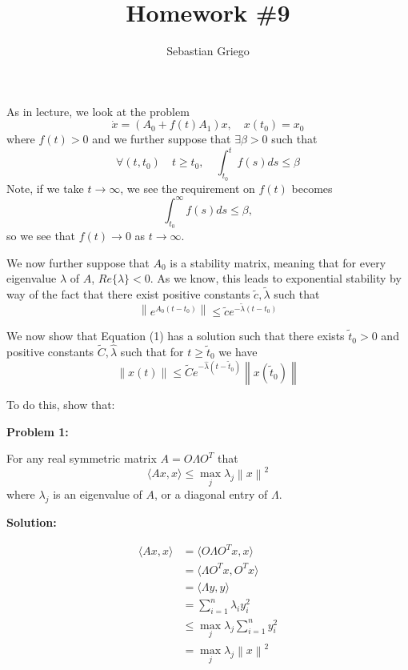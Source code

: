 \documentclass[12pt]{article}
\newcommand{\norm}[1]{\left\lVert #1 \right\rVert}
\newenvironment{problem}[1]{
    \textbf{Problem #1:}
}{
    \rmfamily \vspace{1em}
}
\newenvironment{solution}{
    \textbf{Solution:}
    
}{
    
    \vspace{2em}
}
\begin{document}
\title{Homework \#9}  %
\author{Sebastian Griego}  %
\maketitle

    As in lecture, we look at the problem
    \[
        \dot{x} = (A_0 + f(t)A_1)x, \quad x(t_0) = x_0 \tag{1}
    \]
    where \(f(t) > 0\) and we further suppose that \(\exists \beta > 0\) such that
    \[
        \forall(t, t_0) \quad t \geq t_0, \quad \int_{t_0}^t f(s)ds \leq \beta \tag{2}
    \]
    Note, if we take \(t \to \infty\), we see the requirement on \(f(t)\) becomes
    \[
        \int_{t_0}^{\infty} f(s)ds \leq \beta,
    \]
    so we see that \(f(t) \to 0\) as \(t \to \infty\).

    We now further suppose that \(A_0\) is a stability matrix, meaning that for every eigenvalue \(\lambda\) of \(A\), \(Re\{\lambda\} < 0\). As we know, this leads to exponential stability by way of the fact that there exist positive constants \(\tilde{c}, \tilde{\lambda}\) such that
    \[
        \norm{e^{A_0(t-t_0)}} \leq \tilde{c}e^{-\tilde{\lambda}(t-t_0)}
    \]

    We now show that Equation (1) has a solution such that there exists \(\tilde{t}_0 > 0\) and positive constants \(\tilde{C}, \hat{\lambda}\) such that for \(t \geq \tilde{t}_0\) we have
    \[
        \norm{x(t)} \leq \tilde{C}e^{-\hat{\lambda}(t-\tilde{t}_0)}\norm{x(\tilde{t}_0)}
    \]

    To do this, show that:

\newpage

\begin{problem}{1}
    For any real symmetric matrix \(A = O\Lambda O^T\) that
    \[
        \langle Ax, x \rangle \leq \max_j \lambda_j \norm{x}^2
        \]
    where \(\lambda_j\) is an eigenvalue of \(A\), or a diagonal entry of \(\Lambda\).
\end{problem}

\begin{solution}
\[
    \begin{aligned}
        \langle Ax, x \rangle &= \langle O\Lambda O^T x, x \rangle \\
        &= \langle \Lambda O^T x, O^T x \rangle \\
        &= \langle \Lambda y, y \rangle \\
        &= \sum_{i=1}^n \lambda_i y_i^2 \\
        &\leq \max_j \lambda_j \sum_{i=1}^n y_i^2 \\
        &= \max_j \lambda_j \norm{x}^2
    \end{aligned}
\]
\end{solution}
\end{document}
